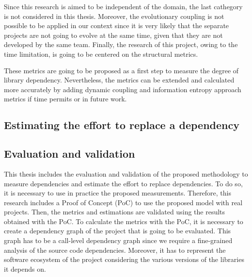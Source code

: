 \blankl
Since this research is aimed to be independent of the domain, the last cathegory is not considered in this thesis. Moreover, the evolutionary coupling is not possible to be applied in our context since it is very likely that the separate projects are not going to evolve at the same time, given that they are not developed by the same team. Finally, the research of this project, owing to the time limitation, is going to be centered on the structural metrics.

These metrics are going to be proposed as a first step to measure the degree of library dependency. Nevertheless, the metrics can be extended and calculated more accurately by adding dynamic coupling and information entropy approach metrics if time permits or in future work.


\subsection{Estimating the effort to replace a dependency}

\begin{comment}
  In order to estimate the effort needed to replace a dependency in a project, there are different variables that need to be considered first:

  - How much code do I need to change - estimate based on the usage of the Dependency
  - Refactoring adjustment
  - How many methods do I need to change.
  - The impact of the change - inside the project.
\end{comment}

\subsection{Evaluation and validation}
This thesis includes the evaluation and validation of the proposed methodology to measure dependencies and estimate the effort to replace dependencies. To do so, it is necessary to use in practice the proposed measurements. Therefore, this research includes a Proof of Concept (PoC) to use the proposed model with real projects. Then, the metrics and estimations are validated using the results obtained with the PoC.
To calculate the metrics with the PoC, it is necessary to create a dependency graph of the project that is going to be evaluated. This graph has to be a call-level dependency graph since we require a fine-grained analysis of the source code dependencies. Moreover, it has to represent the software ecosystem of the project considering the various versions of the libraries it depends on.

